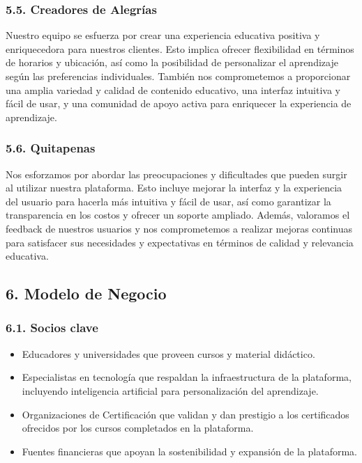 \documentclass[
]{article}
\providecommand{\tightlist}{%
  \setlength{\itemsep}{0pt}\setlength{\parskip}{0pt}}
\begin{document}
\subsubsection{5.5. Creadores de
Alegrías}\label{creadores-de-alegruxedas}

Nuestro equipo se esfuerza por crear una experiencia educativa positiva
y enriquecedora para nuestros clientes. Esto implica ofrecer
flexibilidad en términos de horarios y ubicación, así como la
posibilidad de personalizar el aprendizaje según las preferencias
individuales. También nos comprometemos a proporcionar una amplia
variedad y calidad de contenido educativo, una interfaz intuitiva y
fácil de usar, y una comunidad de apoyo activa para enriquecer la
experiencia de aprendizaje.

\subsubsection{5.6. Quitapenas}\label{quitapenas}

Nos esforzamos por abordar las preocupaciones y dificultades que pueden
surgir al utilizar nuestra plataforma. Esto incluye mejorar la interfaz
y la experiencia del usuario para hacerla más intuitiva y fácil de usar,
así como garantizar la transparencia en los costos y ofrecer un soporte
ampliado. Además, valoramos el feedback de nuestros usuarios y nos
comprometemos a realizar mejoras continuas para satisfacer sus
necesidades y expectativas en términos de calidad y relevancia
educativa.

\newpage

\subsection{6. Modelo de Negocio}\label{modelo-de-negocio}

\subsubsection{6.1. Socios clave}\label{socios-clave}

\begin{itemize}
\tightlist
\item
  Educadores y universidades que proveen cursos y material didáctico.
\item
  Especialistas en tecnología que respaldan la infraestructura de la
  plataforma, incluyendo inteligencia artificial para personalización
  del aprendizaje.
\item
  Organizaciones de Certificación que validan y dan prestigio a los
  certificados ofrecidos por los cursos completados en la plataforma.
\item
  Fuentes financieras que apoyan la sostenibilidad y expansión de la
  plataforma.
\end{itemize}
\end{document}
